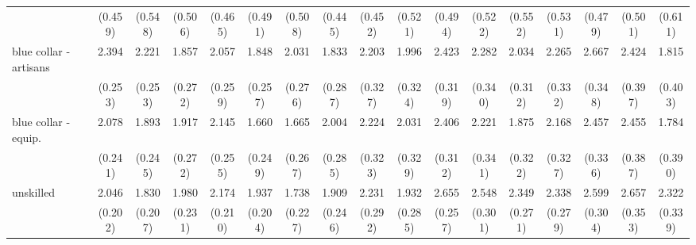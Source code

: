 {\begin{tabular}{l*{16}{c}}
                    &     (0.459)         &     (0.548)         &     (0.506)         &     (0.465)         &     (0.491)         &     (0.508)         &     (0.445)         &     (0.452)         &     (0.521)         &     (0.494)         &     (0.522)         &     (0.552)         &     (0.531)         &     (0.479)         &     (0.501)         &     (0.611)         \\
[1em]
blue collar - artisans&       2.394\sym{***}&       2.221\sym{***}&       1.857\sym{***}&       2.057\sym{***}&       1.848\sym{***}&       2.031\sym{***}&       1.833\sym{***}&       2.203\sym{***}&       1.996\sym{***}&       2.423\sym{***}&       2.282\sym{***}&       2.034\sym{***}&       2.265\sym{***}&       2.667\sym{***}&       2.424\sym{***}&       1.815\sym{***}\\
                    &     (0.253)         &     (0.253)         &     (0.272)         &     (0.259)         &     (0.257)         &     (0.276)         &     (0.287)         &     (0.327)         &     (0.324)         &     (0.319)         &     (0.340)         &     (0.312)         &     (0.332)         &     (0.348)         &     (0.397)         &     (0.403)         \\
[1em]
blue collar - equip.&       2.078\sym{***}&       1.893\sym{***}&       1.917\sym{***}&       2.145\sym{***}&       1.660\sym{***}&       1.665\sym{***}&       2.004\sym{***}&       2.224\sym{***}&       2.031\sym{***}&       2.406\sym{***}&       2.221\sym{***}&       1.875\sym{***}&       2.168\sym{***}&       2.457\sym{***}&       2.455\sym{***}&       1.784\sym{***}\\
                    &     (0.241)         &     (0.245)         &     (0.272)         &     (0.255)         &     (0.249)         &     (0.267)         &     (0.285)         &     (0.323)         &     (0.329)         &     (0.312)         &     (0.341)         &     (0.322)         &     (0.327)         &     (0.336)         &     (0.387)         &     (0.390)         \\
[1em]
unskilled           &       2.046\sym{***}&       1.830\sym{***}&       1.980\sym{***}&       2.174\sym{***}&       1.937\sym{***}&       1.738\sym{***}&       1.909\sym{***}&       2.231\sym{***}&       1.932\sym{***}&       2.655\sym{***}&       2.548\sym{***}&       2.349\sym{***}&       2.338\sym{***}&       2.599\sym{***}&       2.657\sym{***}&       2.322\sym{***}\\
                    &     (0.202)         &     (0.207)         &     (0.231)         &     (0.210)         &     (0.204)         &     (0.227)         &     (0.246)         &     (0.292)         &     (0.285)         &     (0.257)         &     (0.301)         &     (0.271)         &     (0.279)         &     (0.304)         &     (0.353)         &     (0.339)         \\

\end{tabular}}
